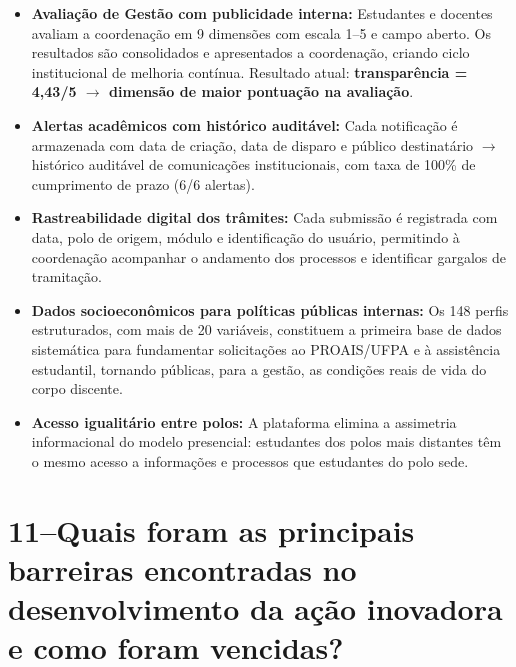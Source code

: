 \documentclass[12pt,a4paper]{article}
\begin{document}
\begin{itemize}[label={\color{ufpablue}\faLock}, itemsep=2pt]
  \item \textbf{Avaliação de Gestão com publicidade interna:} Estudantes e docentes
    avaliam a coordenação em 9 dimensões com escala 1--5 e campo aberto. Os resultados
    são consolidados e apresentados a coordenação, criando ciclo institucional de
    melhoria contínua. Resultado atual: \textbf{transparência = 4,43/5 $\rightarrow$ dimensão de
    maior pontuação na avaliação}.

  \item \textbf{Alertas acadêmicos com histórico auditável:} Cada notificação é
    armazenada com data de criação, data de disparo e público destinatário $\rightarrow$ histórico
    auditável de comunicações institucionais, com taxa de 100\% de cumprimento de prazo
    (6/6 alertas).

  \item \textbf{Rastreabilidade digital dos trâmites:} Cada submissão é registrada
    com data, polo de origem, módulo e identificação do usuário, permitindo à coordenação
    acompanhar o andamento dos processos e identificar gargalos de tramitação.

  \item \textbf{Dados socioeconômicos para políticas públicas internas:} Os 148 perfis
    estruturados, com mais de 20 variáveis, constituem a primeira base de dados sistemática
    para fundamentar solicitações ao PROAIS/UFPA e à assistência estudantil, tornando
    públicas, para a gestão, as condições reais de vida do corpo discente.

  \item \textbf{Acesso igualitário entre polos:} A plataforma elimina a assimetria
    informacional do modelo presencial: estudantes dos polos mais distantes
    têm o mesmo acesso a informações e processos que estudantes do polo sede.
\end{itemize}

\section{11\;–\;Quais foram as principais barreiras encontradas no desenvolvimento da ação inovadora e como foram vencidas?}
\end{document}
